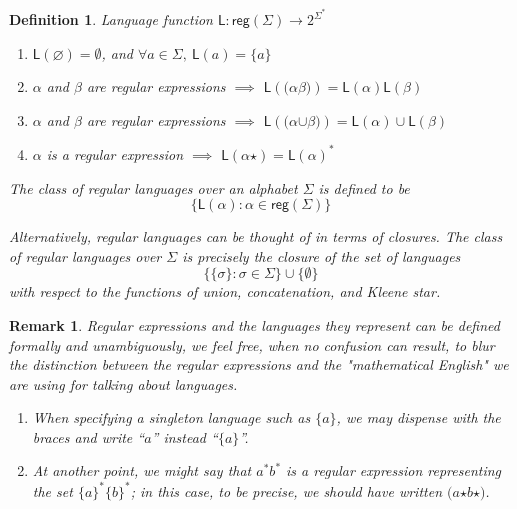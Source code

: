 \documentclass[aps,pra,onecolumn,notitlepage,superscriptaddress]{revtex4-1}
\newcommand{\bs}[1]{\boldsymbol{#1}}
\newcommand{\reg}{\mathsf{reg}}
\newcommand{\Lan}{\mathsf{L}}
\newtheorem{defi}{Definition}
\newtheorem{rem}{Remark}
\begin{document}
    \begin{defi}
        Language function $\Lan: \reg(\Sigma) \to 2^{\Sigma^*}$
        \begin{enumerate}
            \item $\Lan(\bs\varnothing) = \emptyset$, and $\forall a \in \Sigma,\ \Lan(a) = \{a\}$
            \item $\alpha$ and $\beta$ are regular expressions $\implies$ $\Lan(\bs (\alpha\beta \bs)) = \Lan(\alpha)\Lan(\beta)$
            \item $\alpha$ and $\beta$ are regular expressions $\implies$ $\Lan(\bs(\alpha \bs\cup \beta \bs)) = \Lan(\alpha) \cup \Lan(\beta)$
            \item $\alpha$ is a regular expression $\implies$ $\Lan(\alpha\bs\star) = \Lan(\alpha)^*$
        \end{enumerate}
        
        The class of regular languages over an alphabet $\Sigma$ is defined to be
        \begin{equation*}
            \{ \Lan(\alpha) : \alpha \in \reg(\Sigma) \}
        \end{equation*}

        Alternatively, regular languages can be thought of in terms of closures. The class of regular languages over $\Sigma$ is precisely the closure of the set of languages
        \begin{equation*}
            \{ \{ \sigma \} : \sigma \in \Sigma \} \cup \{ \emptyset \}
        \end{equation*}
        with respect to the functions of union, concatenation, and Kleene star.
    \end{defi}

    \begin{rem}
        Regular expressions and the languages they represent can be defined formally and unambiguously, we feel free, when no confusion can result, to blur the distinction between the regular expressions and the "mathematical English" we are using for talking about languages. 
        \begin{enumerate}
            \item When specifying a singleton language such as $\{ a \}$, we may dispense with the braces and write ``$a$'' instead ``$\{ a \}$''.
            \item At another point, we might say that $a^*b^*$ is a regular expression representing the set $\{a\}^* \{b\}^*$; in this case, to be precise, we should have written $\bs( a \bs\star b \bs\star \bs)$.
        \end{enumerate}
    \end{rem}
\end{document}

